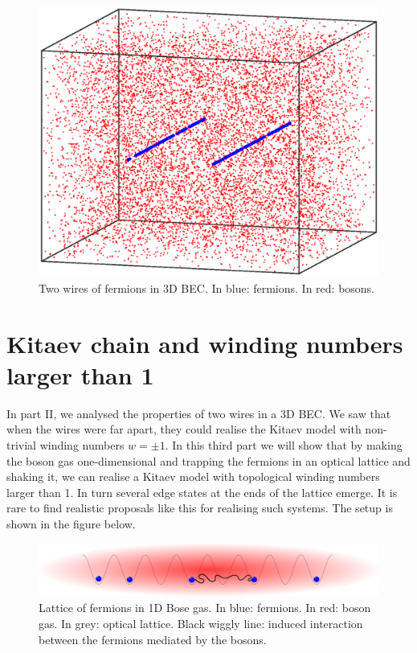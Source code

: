 \documentclass[9pt, twoside]{Thesis}
\begin{document}
\vspace{2.5cm}

\begin{figure}[H]
\center
\includegraphics[width=0.8\columnwidth]{gasandwires3.eps}
\\ Two wires of fermions in 3D BEC. In blue: fermions. In red: bosons.  
\end{figure}

\newpage


 
 
 

\part{Kitaev chain and winding numbers larger than 1}
\fancyhead[LE,RO]{\thepage}
In part II, we analysed the properties of two wires in a 3D BEC. We saw that when the wires were far apart, they could realise the Kitaev model with non-trivial winding numbers $w = \pm 1$. In this third part we will show that by making the boson gas one-dimensional and trapping the fermions in an optical lattice and shaking it, we can realise a Kitaev model with topological winding numbers larger than 1. In turn several edge states at the ends of the lattice emerge. It is rare to find realistic proposals like this for realising such systems. The setup is shown in the figure below. 

\vspace{2.5cm}

\begin{figure}[H]
\center
\includegraphics[width=1\columnwidth]{gasandlattice.eps}
\\ Lattice of fermions in 1D Bose gas. In blue: fermions. In red: boson gas. In grey: optical lattice. Black wiggly line: induced interaction between the fermions mediated by the bosons.   
\end{figure}
\end{document}
